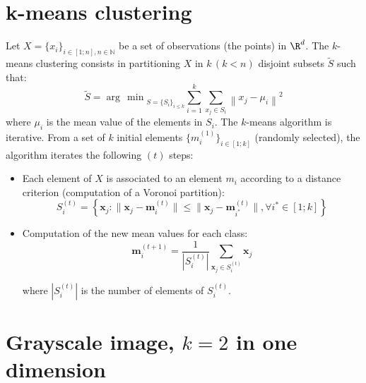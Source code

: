 \section{k-means clustering}
Let $X=\{x_i\}_{i\in [1;n], n\in \mathbb{N}}$ be a set of observations (the points) in $\R^d$. The $k$-means clustering consists in partitioning $X$ in $k\, (k<n)$ disjoint subsets $\tilde{S}$ such that:
\begin{equation}\tilde{S}=\displaystyle{\arg\,\min}_{S=\{S_i\}_{i\leq k}} \sum_{i=1}^{k} \sum_{x_j \in S_i} \left\|  x_j - \mu_i \right\|^2\end{equation}
where $\mu_i$ is the mean value of the elements in $S_i$. The $k$-means algorithm is iterative. From a set of $k$ initial elements $\{m_i^{(1)}\}_{i\in[1;k]}$ (randomly selected), the algorithm iterates the following $(t)$ steps:
\begin{itemize}
 \item Each element of $X$ is associated to an element $m_i$ according to a distance criterion (computation of a Voronoi partition):
\begin{equation}S_i^{(t)} = \left\{ \mathbf x_j : \big\| \mathbf x_j - \mathbf m^{(t)}_i \big\| \leq \big\| \mathbf x_j - \mathbf m^{(t)}_{i^*} \big\|, \forall i^*\in [1;k] \right\}\end{equation}

\item Computation of the new mean values for each class:\vspace*{-6pt}
\begin{equation} \mathbf m^{(t+1)}_i = \frac{1}{|S^{(t)}_i|} \sum_{\mathbf x_j \in S^{(t)}_i} \mathbf x_j\end{equation}
\vspace*{-\baselineskip}\vspace*{3pt}

\noindent where $|S^{(t)}_i|$ is the number of elements of $S^{(t)}_i$.
\end{itemize} 

\vspace*{-10pt}

\section{Grayscale image, $k=2$ in one dimension}

\vspace*{-6pt}

